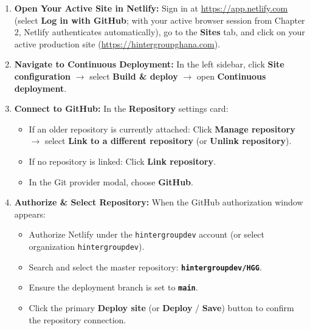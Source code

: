 \documentclass[11pt,a4paper,oneside]{book}
\begin{document}
\begin{enumerate}[leftmargin=*,label=\textbf{Step \arabic*:}]
  \item \textbf{Open Your Active Site in Netlify:}
    Sign in at \url{https://app.netlify.com} (select \textbf{Log in with GitHub}; with your active browser session from Chapter 2, Netlify authenticates automatically), go to the \textbf{Sites} tab, and click on your active production site (\url{https://hintergroupghana.com}).

  \item \textbf{Navigate to Continuous Deployment:}
    In the left sidebar, click \textbf{Site configuration} $\rightarrow$ select \textbf{Build \& deploy} $\rightarrow$ open \textbf{Continuous deployment}.

  \item \textbf{Connect to GitHub:}
    In the \textbf{Repository} settings card:
    \begin{itemize}[leftmargin=1.2cm]
      \item If an older repository is currently attached: Click \textbf{Manage repository} $\rightarrow$ select \textbf{Link to a different repository} (or \textbf{Unlink repository}).
      \item If no repository is linked: Click \textbf{Link repository}.
      \item In the Git provider modal, choose \textbf{GitHub}.
    \end{itemize}

  \item \textbf{Authorize \& Select Repository:}
    When the GitHub authorization window appears:
    \begin{itemize}[leftmargin=1.2cm]
      \item Authorize Netlify under the \texttt{hintergroupdev} account (or select organization \texttt{hintergroupdev}).
      \item Search and select the master repository: \textbf{\texttt{hintergroupdev/HGG}}.
      \item Ensure the deployment branch is set to \textbf{\texttt{main}}.
      \item Click the primary \textbf{Deploy site} (or \textbf{Deploy} / \textbf{Save}) button to confirm the repository connection.
    \end{itemize}
\end{enumerate}

\end{document}
